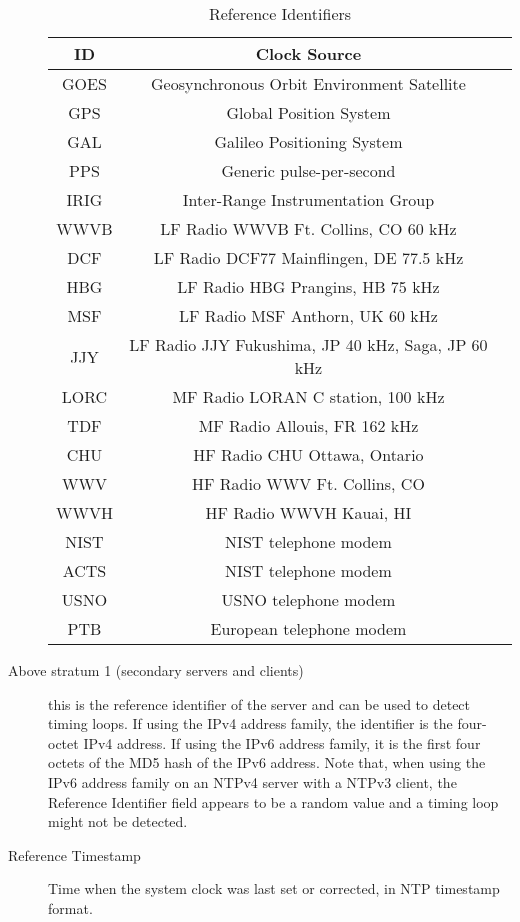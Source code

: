 \begin{description}
\begin{table}[htb]
\center
\begin{tabular}{c | c | c}
ID & Clock Source \\
\hline
\hline
GOES & Geosynchronous Orbit Environment Satellite \\
GPS & Global Position System \\
GAL & Galileo Positioning System \\
PPS & Generic pulse-per-second \\
IRIG & Inter-Range Instrumentation Group \\
WWVB & LF Radio WWVB Ft. Collins, CO 60 kHz \\
DCF & LF Radio DCF77 Mainflingen, DE 77.5 kHz \\
HBG & LF Radio HBG Prangins, HB 75 kHz \\
MSF & LF Radio MSF Anthorn, UK 60 kHz \\
JJY & LF Radio JJY Fukushima, JP 40 kHz, Saga, JP 60 kHz \\
LORC & MF Radio LORAN C station, 100 kHz \\
TDF & MF Radio Allouis, FR 162 kHz \\
CHU & HF Radio CHU Ottawa, Ontario \\
WWV & HF Radio WWV Ft. Collins, CO \\
WWVH & HF Radio WWVH Kauai, HI \\
NIST & NIST telephone modem \\
ACTS & NIST telephone modem \\
USNO & USNO telephone modem \\
PTB & European telephone modem \\
\hline
\end{tabular}
\label{reference_identifiers}
\caption{Reference Identifiers}
\end{table}

\item[Above stratum 1 (secondary servers and clients)] this is the
reference identifier of the server and can be used to detect timing
loops. If using the IPv4 address family, the identifier is the four-
octet IPv4 address. If using the IPv6 address family, it is the
first four octets of the MD5 hash of the IPv6 address. Note that,
when using the IPv6 address family on an NTPv4 server with a NTPv3
client, the Reference Identifier field appears to be a random value
and a timing loop might not be detected.

\item[Reference Timestamp] Time when the system clock was last set or
corrected, in NTP timestamp format.


\end{description}
